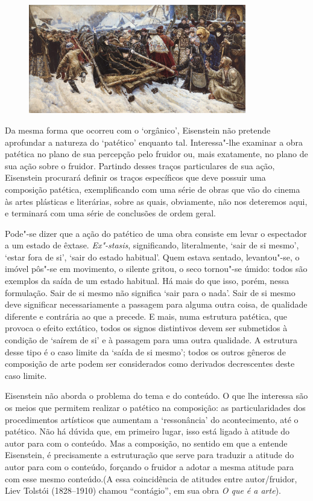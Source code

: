 \begin{figure}[!ht]
\centering
  \includegraphics[width=95mm]{./imgs/fig8.jpg}
\end{figure}

Da mesma forma que ocorreu com o `orgânico', Eisenstein não pretende
aprofundar a natureza do `patético' enquanto tal. Interessa"-lhe examinar
a obra patética no plano de sua percepção pelo fruidor ou, mais
exatamente, no plano de sua ação sobre o fruidor. Partindo desses traços
particulares de sua ação, Eisenstein procurará definir os traços
específicos que deve possuir uma composição patética, exemplificando com
uma série de obras que vão do cinema às artes plásticas e literárias,
sobre as quais, obviamente, não nos deteremos aqui, e terminará com uma
série de conclusões de ordem geral.

Pode"-se dizer que a ação do patético de uma obra consiste em levar o
espectador a um estado de êxtase. \emph{Ex"-stasis}, significando,
literalmente, `sair de si mesmo', `estar fora de si', `sair do estado
habitual'. Quem estava sentado, levantou"-se, o imóvel pôs"-se em
movimento, o silente gritou, o seco tornou"-se úmido: todos são exemplos
da saída de um estado habitual. Há mais do que isso, porém, nessa
formulação. Sair de si mesmo não significa `sair para o nada'. Sair de
si mesmo deve significar necessariamente a passagem para alguma outra
coisa, de qualidade diferente e contrária ao que a precede. E mais, numa
estrutura patética, que provoca o efeito extático, todos os signos
distintivos devem ser submetidos à condição de `saírem de si' e à
passagem para uma outra qualidade. A estrutura desse tipo é o caso
limite da `saída de si mesmo'; todos os outros gêneros de composição de
arte podem ser considerados como derivados decrescentes deste caso
limite.

Eisenstein não aborda o problema do tema e do conteúdo. O que lhe
interessa são os meios que permitem realizar o patético na composição:
as particularidades dos procedimentos artísticos que aumentam a
`ressonância' do acontecimento, até o patético. Não há dúvida que, em
primeiro lugar, isso está ligado à atitude do autor para com o conteúdo.
Mas a composição, no sentido em que a entende Eisenstein, é precisamente
a estruturação que serve para traduzir a atitude do autor para com o
conteúdo, forçando o fruidor a adotar a mesma atitude para com esse
mesmo conteúdo.(A essa coincidência de atitudes entre autor/fruidor,
Liev Tolstói (1828--1910) chamou ``contágio'', em sua obra \emph{O que é
a arte}).

